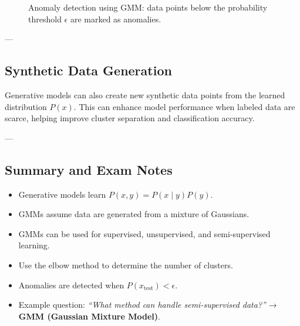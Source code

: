 \begin{figure}[h]
\centering
{}
\caption{Anomaly detection using GMM: data points below the probability threshold $\epsilon$ are marked as anomalies.}
\end{figure}

---

\subsection{Synthetic Data Generation}

Generative models can also create new synthetic data points from the learned distribution \( P(x) \).  
This can enhance model performance when labeled data are scarce, helping improve cluster separation and classification accuracy.

---

\subsection{Summary and Exam Notes}

\begin{itemize}
    \item Generative models learn \( P(x, y) = P(x \mid y) P(y) \).
    \item GMMs assume data are generated from a mixture of Gaussians.
    \item GMMs can be used for supervised, unsupervised, and semi-supervised learning.
    \item Use the elbow method to determine the number of clusters.
    \item Anomalies are detected when \( P(x_{\text{test}}) < \epsilon \).
    \item Example question: \textit{``What method can handle semi-supervised data?''} → \textbf{GMM (Gaussian Mixture Model)}.
\end{itemize}
